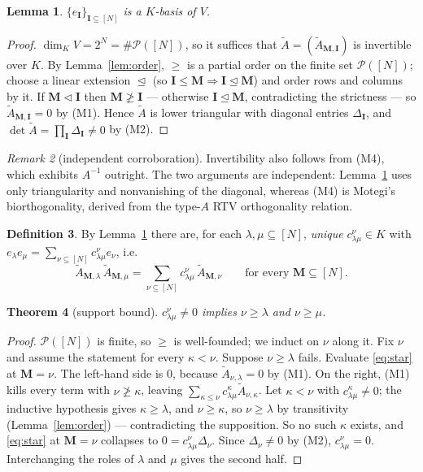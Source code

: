 \documentclass[11pt]{article}
\theoremstyle{plain}
\newtheorem{thm}{Theorem}
\newtheorem{lem}[thm]{Lemma}
\theoremstyle{definition}
\newtheorem{defn}[thm]{Definition}
\theoremstyle{remark}
\newtheorem{rem}[thm]{Remark}
\newcommand{\bI}{\mathbf{I}}
\newcommand{\bM}{\mathbf{M}}
\begin{document}
\begin{lem}\label{lem:basis}
$\{e_{\bI}\}_{\bI\subseteq[N]}$ is a $K$-basis of $V$.
\end{lem}

\begin{proof}
$\dim_K V=2^N=\#\mathcal P([N])$, so it suffices that
$\widetilde A=(\widetilde A_{\bM,\bI})$ is invertible over $K$.  By
Lemma~\ref{lem:order}, $\ge$ is a partial order on the finite set
$\mathcal P([N])$; choose a linear extension $\trianglelefteq$ (so
$\bI\le\bM\Rightarrow\bI\trianglelefteq\bM$) and order rows and columns by it.
If $\bM\vartriangleleft\bI$ then $\bM\not\ge\bI$ --- otherwise
$\bI\trianglelefteq\bM$, contradicting the strictness --- so
$\widetilde A_{\bM,\bI}=0$ by (M1).  Hence $\widetilde A$ is lower triangular
with diagonal entries $\Delta_{\bI}$, and
$\det\widetilde A=\prod_{\bI}\Delta_{\bI}\ne0$ by (M2).
\end{proof}

\begin{rem}[independent corroboration]
Invertibility also follows from (M4), which exhibits $A^{-1}$ outright.  The two
arguments are independent: Lemma~\ref{lem:basis} uses only triangularity and
nonvanishing of the diagonal, whereas (M4) is Motegi's biorthogonality, derived
from the type-$A$ RTV orthogonality relation.
\end{rem}

\begin{defn}
By Lemma~\ref{lem:basis} there are, for each $\lambda,\mu\subseteq[N]$,
\emph{unique} $c^{\nu}_{\lambda\mu}\in K$ with
$e_{\lambda}e_{\mu}=\sum_{\nu\subseteq[N]}c^{\nu}_{\lambda\mu}e_{\nu}$, i.e.
\begin{equation}\label{eq:star}
\widetilde A_{\bM,\lambda}\,\widetilde A_{\bM,\mu}
=\sum_{\nu\subseteq[N]}c^{\nu}_{\lambda\mu}\,\widetilde A_{\bM,\nu}
\qquad\text{for every }\bM\subseteq[N].
\end{equation}
\end{defn}

\begin{thm}[support bound]\label{thm:support}
$c^{\nu}_{\lambda\mu}\ne0$ implies $\nu\ge\lambda$ and $\nu\ge\mu$.
\end{thm}

\begin{proof}
$\mathcal P([N])$ is finite, so $\ge$ is well-founded; we induct on $\nu$ along
it.  Fix $\nu$ and assume the statement for every $\kappa<\nu$.  Suppose
$\nu\ge\lambda$ fails.  Evaluate \eqref{eq:star} at $\bM=\nu$.  The left-hand
side is $0$, because $\widetilde A_{\nu,\lambda}=0$ by (M1).  On the right,
(M1) kills every term with $\nu\not\ge\kappa$, leaving
$\sum_{\kappa\le\nu}c^{\kappa}_{\lambda\mu}\widetilde A_{\nu,\kappa}$.  Let
$\kappa<\nu$ with $c^{\kappa}_{\lambda\mu}\ne0$; the inductive hypothesis gives
$\kappa\ge\lambda$, and $\nu\ge\kappa$, so $\nu\ge\lambda$ by transitivity
(Lemma~\ref{lem:order}) --- contradicting the supposition.  So no such $\kappa$
exists, and \eqref{eq:star} at $\bM=\nu$ collapses to
$0=c^{\nu}_{\lambda\mu}\Delta_{\nu}$.  Since $\Delta_{\nu}\ne0$ by (M2),
$c^{\nu}_{\lambda\mu}=0$.  Interchanging the roles of $\lambda$ and $\mu$ gives
the second half.
\end{proof}
\end{document}
